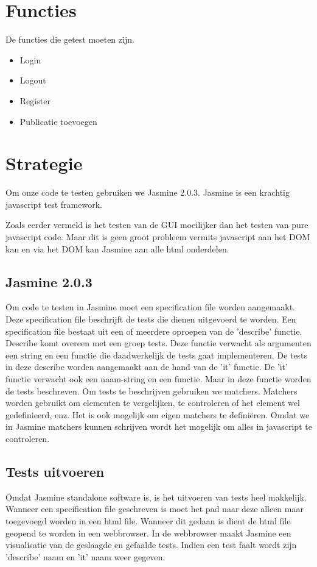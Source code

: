 \documentclass{article}
\begin{document}
\section{Functies}
De functies die getest moeten zijn.
\begin{itemize}
  \item Login 
  \item Logout 
  \item Register
  \item Publicatie toevoegen 
\end{itemize}

\section{Strategie}
Om onze code te testen gebruiken we Jasmine 2.0.3. Jasmine is een krachtig javascript test framework.
\newline

Zoals eerder vermeld is het testen van de GUI moeilijker dan het testen van pure javascript code. Maar dit is geen groot probleem vermits javascript aan het DOM kan en via het DOM kan Jasmine aan alle html onderdelen. 

\subsection{Jasmine 2.0.3}
Om code te testen in Jasmine moet een specification file worden aangemaakt. Deze specification file beschrijft de tests die dienen uitgevoerd te worden. 
\newline
Een specification file bestaat uit een of meerdere oproepen van de 'describe' functie. Describe komt overeen met een groep tests. Deze functie verwacht als argumenten een string en een functie die daadwerkelijk de tests gaat implementeren.
\newline
De tests in deze describe worden aangemaakt aan de hand van de 'it' functie. De 'it' functie verwacht ook een naam-string en een functie. Maar in deze functie worden de tests beschreven.
\newline
Om tests te beschrijven gebruiken we matchers. Matchers worden gebruikt om elementen te vergelijken, te controleren of het element wel gedefinieerd, enz. Het is ook mogelijk om eigen matchers te defini{\"e}ren.
\newline
Omdat we in Jasmine matchers kunnen schrijven wordt het mogelijk om alles in javascript te controleren.

\subsection{Tests uitvoeren}
Omdat Jasmine standalone software is, is het uitvoeren van tests heel makkelijk. Wanneer een specification file geschreven is moet het pad naar deze alleen maar toegevoegd worden in een html file. Wanneer dit gedaan is dient de html file geopend te worden in een webbrowser. In de webbrowser maakt Jasmine een visualisatie van de geslaagde en gefaalde tests. Indien een test faalt wordt zijn 'describe' naam en 'it' naam weer gegeven.
\end{document}
